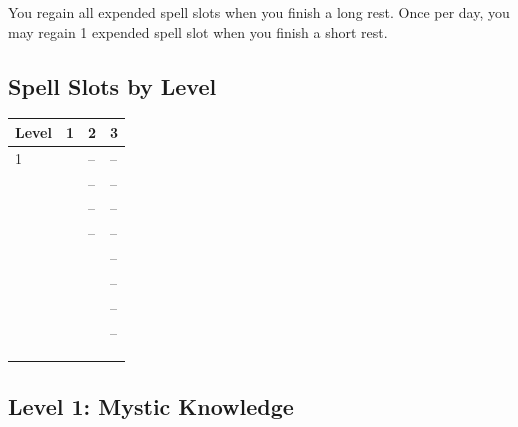 \documentclass[12pt,letterpaper,twocolumn,openany,nodeprecatedcode,bg=none]{dndbook}
\let\oldsubsection\subsection
\renewcommand{\subsection}[1]{%
  \needspace{5\baselineskip}%
  \oldsubsection{#1}%
}
\begin{document}
You regain all expended spell slots when you finish a long rest. Once
per day, you may regain 1 expended spell slot when you finish a short
rest.

\subsection{Spell Slots by Level}\label{spell-slots-by-level}


{\def\LTcaptype{none} %
\begin{table}[!htbp]
\centering
\begin{tabular}{@{}
  >{\raggedright\arraybackslash}p{}
  >{\raggedright\arraybackslash}p{}
  >{\raggedright\arraybackslash}p{}
  >{\raggedright\arraybackslash}p{}@{}}
\toprule\noalign{}
\begin{minipage}[b]{\linewidth}\raggedright
Level
\end{minipage} & \begin{minipage}[b]{\linewidth}\raggedright
1
\end{minipage} & \begin{minipage}[b]{\linewidth}\raggedright
2
\end{minipage} & \begin{minipage}[b]{\linewidth}\raggedright
3
\end{minipage} \\
\midrule\noalign{}
1 & 3 & -- & -- \\
2 & 3 & -- & -- \\
3 & 4 & -- & -- \\
4 & 4 & -- & -- \\
5 & 4 & 3 & -- \\
6 & 4 & 3 & -- \\
7 & 4 & 3 & -- \\
8 & 4 & 3 & -- \\
9 & 4 & 3 & 2 \\
10 & 4 & 3 & 2 \\
\bottomrule\noalign{}
\end{tabular}
\end{table}
}

\subsection{Level 1: Mystic Knowledge}\label{level-1-mystic-knowledge}
\end{document}
